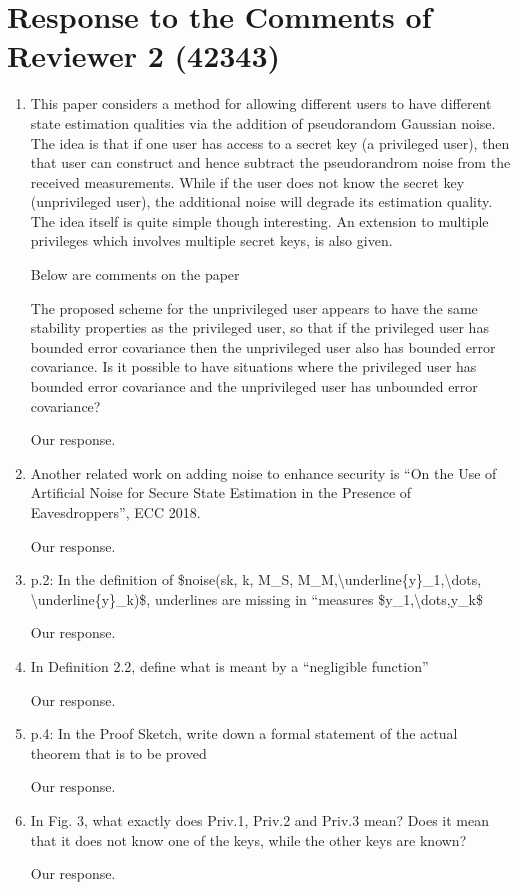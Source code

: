 \documentclass[a4paper]{scrartcl}
\newenvironment{rebuttal}{\begin{enumerate}[label={\color{grey}\thesection.\arabic{enumi}},leftmargin=0pt,ref=\thesection.\arabic{enumi}]}{\end{enumerate}}
\newcommand{\reviewtext}[1]{{\color{nblue} #1}}
\begin{document}
\section*{Response to the Comments of Reviewer 2 (42343)}
\def\thesection{R2}
\begin{rebuttal}
\item \reviewtext{This paper considers a method for allowing different users to have different state estimation qualities via the addition of pseudorandom Gaussian noise. The idea is that if one user has access to a secret key (a privileged user), then that user can construct and hence subtract the pseudorandrom noise from the received measurements. While if the user does not know the secret key (unprivileged user), the additional noise will degrade its estimation quality. The idea itself is quite simple though interesting. An extension to multiple privileges which involves multiple secret keys, is also given. 

Below are comments on the paper

The proposed scheme for the unprivileged user appears to have the same stability properties as the privileged user, so that if the privileged user has bounded error covariance then the unprivileged user also has bounded error covariance. Is it possible to have situations where the privileged user has bounded error covariance and the unprivileged user has unbounded error covariance?}

Our response.

\item \reviewtext{Another related work on adding noise to enhance security is ``On the Use of Artificial Noise for Secure State Estimation in the Presence of Eavesdroppers'', ECC 2018.}

Our response.

\item \reviewtext{p.2: In the definition of \$noise(sk, k, M\_S, M\_M,\textbackslash underline\{y\}\_1,\textbackslash dots, \textbackslash underline\{y\}\_k)\$, underlines are missing in ``measures \$y\_1,\textbackslash dots,y\_k\$}

Our response.

\item \reviewtext{In Definition 2.2, define what is meant by a ``negligible function''}

Our response.

\item \reviewtext{p.4: In the Proof Sketch, write down a formal statement of the actual theorem that is to be proved}

Our response.

\item \reviewtext{In Fig. 3, what exactly does  Priv.1, Priv.2 and Priv.3 mean? Does it
mean that it does not know one of the keys, while the other keys are
known?}

Our response.

\end{rebuttal}
\end{document}
